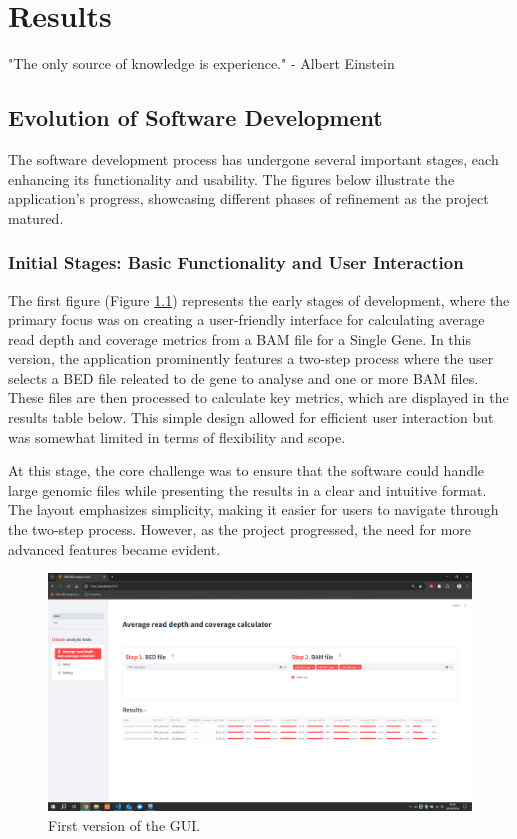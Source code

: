 \chapter{Results}
\label{chapter:Results}

\begin{introduction}
    "The only source of knowledge is experience." - Albert Einstein
\end{introduction}

\section{Evolution of Software Development}

The software development process has undergone several important stages, each enhancing its functionality and usability. The figures below illustrate the application's progress, showcasing different phases of refinement as the project matured.

\subsection{Initial Stages: Basic Functionality and User Interaction}

The first figure (Figure \ref{fig:v1}) represents the early stages of development, where the primary focus was on creating a user-friendly interface for calculating average read depth and coverage metrics from a BAM file for a Single Gene. In this version, the application prominently features a two-step process where the user selects a BED file releated to de gene to analyse and one or more BAM files. These files are then processed to calculate key metrics, which are displayed in the results table below. This simple design allowed for efficient user interaction but was somewhat limited in terms of flexibility and scope.

At this stage, the core challenge was to ensure that the software could handle large genomic files while presenting the results in a clear and intuitive format. The layout emphasizes simplicity, making it easier for users to navigate through the two-step process. However, as the project progressed, the need for more advanced features became evident.

\begin{figure}[H]
    \centering
    \includegraphics[width=1\textwidth]{figs/v1.png}
    \caption{First version of the GUI.} 
    \label{fig:v1}
\end{figure}

